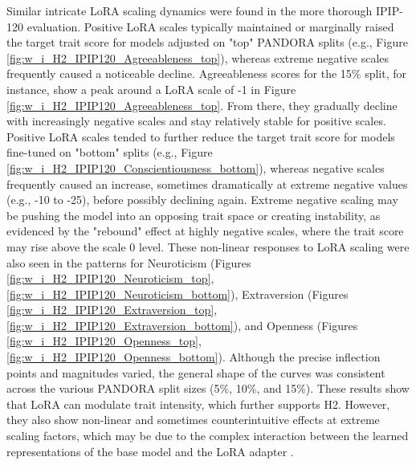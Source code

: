\documentclass{DESSThesis}
\begin{document}
Similar intricate LoRA scaling dynamics were found in the more thorough IPIP-120 evaluation. Positive LoRA scales typically maintained or marginally raised the target trait score for models adjusted on "top" PANDORA splits (e.g., Figure \ref{fig:w_i_H2_IPIP120_Agreeableness_top}), whereas extreme negative scales frequently caused a noticeable decline. Agreeableness scores for the 15\% split, for instance, show a peak around a LoRA scale of -1 in Figure \ref{fig:w_i_H2_IPIP120_Agreeableness_top}. From there, they gradually decline with increasingly negative scales and stay relatively stable for positive scales. Positive LoRA scales tended to further reduce the target trait score for models fine-tuned on "bottom" splits (e.g., Figure \ref{fig:w_i_H2_IPIP120_Conscientiousness_bottom}), whereas negative scales frequently caused an increase, sometimes dramatically at extreme negative values (e.g., -10 to -25), before possibly declining again. Extreme negative scaling may be pushing the model into an opposing trait space or creating instability, as evidenced by the "rebound" effect at highly negative scales, where the trait score may rise above the scale 0 level. These non-linear responses to LoRA scaling were also seen in the patterns for Neuroticism (Figures \ref{fig:w_i_H2_IPIP120_Neuroticism_top}, \ref{fig:w_i_H2_IPIP120_Neuroticism_bottom}), Extraversion (Figures \ref{fig:w_i_H2_IPIP120_Extraversion_top}, \ref{fig:w_i_H2_IPIP120_Extraversion_bottom}), and Openness (Figures \ref{fig:w_i_H2_IPIP120_Openness_top}, \ref{fig:w_i_H2_IPIP120_Openness_bottom}). Although the precise inflection points and magnitudes varied, the general shape of the curves was consistent across the various PANDORA split sizes (5\%, 10\%, and 15\%). These results show that LoRA can modulate trait intensity, which further supports H2. However, they also show non-linear and sometimes counterintuitive effects at extreme scaling factors, which may be due to the complex interaction between the learned representations of the base model and the LoRA adapter \cite{zhao_lora_2024, biderman_lora_2024}.
\end{document}
